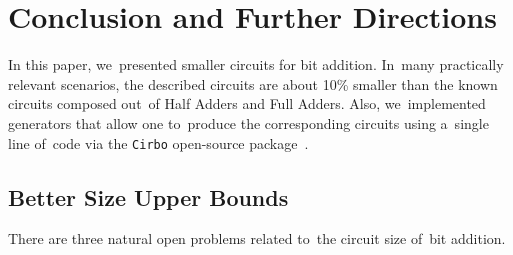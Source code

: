 \documentclass[sigconf, review, anonymous]{acmart}
\begin{document}
\section{Conclusion and Further Directions}
In this paper, we~presented smaller circuits for bit addition.
In~many practically relevant scenarios, the described circuits
are about 10\% smaller than the known circuits composed
out~of Half Adders and Full Adders.
Also, we~implemented generators that allow one
to~produce the corresponding circuits using a~single line of~code
via the \texttt{Cirbo} open-source package~\cite{DBLP:conf/aaai/AverkovBEGKKKLL25}.

\subsection{Better Size Upper Bounds}
There are three natural open problems related to~the circuit size of~bit addition.
\end{document}
